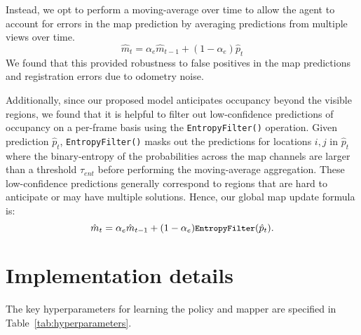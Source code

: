 \documentclass[runningheads]{llncs}
\newcommand{\code}[1]{\texttt{\small #1}}
\begin{document}
Instead, we opt to perform a moving-average over time to allow the agent to account for errors in the map prediction by averaging predictions from multiple views over time.
\begin{equation}
    \hat{m}_{t} = \alpha_{e}\hat{m}_{t-1} +  (1-\alpha_{e})\hat{p}_{t}
\end{equation}
We found that this provided robustness to false positives in the map predictions and registration errors due to odometry noise.

Additionally, since our proposed model anticipates occupancy beyond the visible regions, we found that it is helpful to filter out low-confidence predictions of occupancy on a per-frame basis using the \code{EntropyFilter()} operation.
Given prediction $\hat{p}_t$, \code{EntropyFilter()} masks out the predictions for locations $i,j$ in $\hat{p}_t$ where the binary-entropy of the probabilities across the map channels are larger than a threshold $\tau_{ent}$ before performing the moving-average aggregation.
These low-confidence predictions generally correspond to regions that are hard to anticipate or may have multiple solutions.
Hence, our global map update formula is:
\begin{equation}
    \hat{m}_{t} = \alpha_{e}\hat{m}_{t-1} +  (1-\alpha_{e})\text{\code{EntropyFilter}}(\hat{p}_{t}).
\end{equation}

\vfill
\pagebreak

\section{Implementation details}
\label{sec:implementation_details}
The key hyperparameters for learning the policy and mapper are specified in Table~\ref{tab:hyperparameters}.
\end{document}
